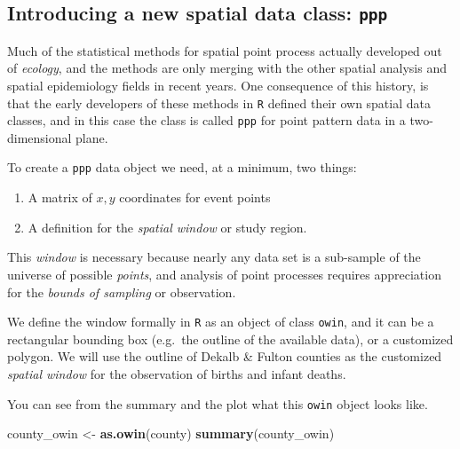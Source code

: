 \documentclass[
]{book}
\newenvironment{Shaded}{\begin{snugshade}}{\end{snugshade}}
\newcommand{\FunctionTok}[1]{\textcolor[rgb]{0.13,0.29,0.53}{\textbf{#1}}}
\newcommand{\NormalTok}[1]{#1}
\newcommand{\OtherTok}[1]{\textcolor[rgb]{0.56,0.35,0.01}{#1}}
\providecommand{\tightlist}{%
  \setlength{\itemsep}{0pt}\setlength{\parskip}{0pt}}
\begin{document}
\hypertarget{introducing-a-new-spatial-data-class-ppp}{%
\subsection{\texorpdfstring{Introducing a new spatial data class: \texttt{ppp}}{Introducing a new spatial data class: ppp}}\label{introducing-a-new-spatial-data-class-ppp}}

Much of the statistical methods for spatial point process actually developed out of \emph{ecology}, and the methods are only merging with the other spatial analysis and spatial epidemiology fields in recent years. One consequence of this history, is that the early developers of these methods in \texttt{R} defined their own spatial data classes, and in this case the class is called \texttt{ppp} for point pattern data in a two-dimensional plane.

To create a \texttt{ppp} data object we need, at a minimum, two things:

\begin{enumerate}
\def\labelenumi{\arabic{enumi}.}
\tightlist
\item
  A matrix of \(x,y\) coordinates for event points
\item
  A definition for the \emph{spatial window} or study region.
\end{enumerate}

This \emph{window} is necessary because nearly any data set is a sub-sample of the universe of possible \emph{points}, and analysis of point processes requires appreciation for the \emph{bounds of sampling} or observation.

We define the window formally in \texttt{R} as an object of class \texttt{owin}, and it can be a rectangular bounding box (e.g.~the outline of the available data), or a customized polygon. We will use the outline of Dekalb \& Fulton counties as the customized \emph{spatial window} for the observation of births and infant deaths.

You can see from the summary and the plot what this \texttt{owin} object looks like.

\begin{Shaded}
\begin{Highlighting}[]
\NormalTok{county\_owin }\OtherTok{\textless{}{-}} \FunctionTok{as.owin}\NormalTok{(county)}
\FunctionTok{summary}\NormalTok{(county\_owin)}
\end{Highlighting}
\end{Shaded}
\end{document}

